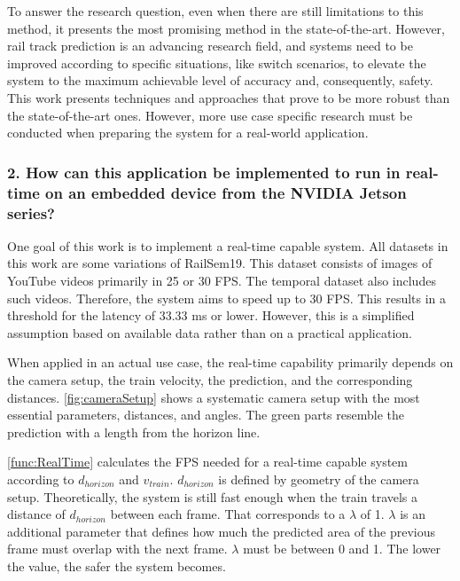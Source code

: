 To answer the research question, even when there are still limitations to this method, it presents the most promising method in the state-of-the-art.
However, rail track prediction is an advancing research field, and systems need to be improved according to specific situations, like switch scenarios, to elevate the system to the maximum achievable level of accuracy and, consequently, safety.
This work presents techniques and approaches that prove to be more robust than the state-of-the-art ones.
However, more use case specific research must be conducted when preparing the system for a real-world application.

\subsubsection{2. How can this application be implemented to run in real-time on an embedded device from the NVIDIA Jetson series?}

One goal of this work is to implement a real-time capable system.
All datasets in this work are some variations of RailSem19.
This dataset consists of images of YouTube videos primarily in 25 or 30 \ac{FPS}.
The temporal dataset also includes such videos.
Therefore, the system aims to speed up to 30 \ac{FPS}.
This results in a threshold for the latency of 33.33 ms or lower.
However, this is a simplified assumption based on available data rather than on a practical application.

When applied in an actual use case, the real-time capability primarily depends on the camera setup, the train velocity, the prediction, and the corresponding distances.
\autoref{fig:cameraSetup} shows a systematic camera setup with the most essential parameters, distances, and angles.
The green parts resemble the prediction with a length from the horizon line.

\autoref{func:RealTime} calculates the \ac{FPS} needed for a real-time capable system according to $d_{horizon}$ and $v_{train}$.
$d_{horizon}$ is defined by geometry of the camera setup.
Theoretically, the system is still fast enough when the train travels a distance of $d_{horizon}$ between each frame.
That corresponds to a $\lambda$ of 1.
$\lambda$ is an additional parameter that defines how much the predicted area of the previous frame must overlap with the next frame.
$\lambda$ must be between 0 and 1.
The lower the value, the safer the system becomes.

